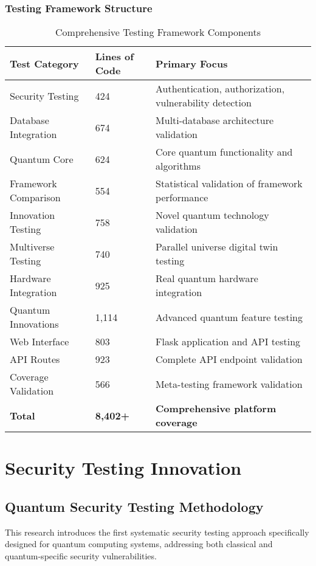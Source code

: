 \documentclass[12pt,a4paper]{report}
\begin{document}
\subsubsection{Testing Framework Structure}

\begin{table}[H]
\centering
\caption{Comprehensive Testing Framework Components}
\begin{tabular}{@{}p{4cm}p{2cm}p{6cm}@{}}
\toprule
Test Category & Lines of Code & Primary Focus \\
\midrule
Security Testing & 424 & Authentication, authorization, vulnerability detection \\
Database Integration & 674 & Multi-database architecture validation \\
Quantum Core & 624 & Core quantum functionality and algorithms \\
Framework Comparison & 554 & Statistical validation of framework performance \\
Innovation Testing & 758 & Novel quantum technology validation \\
Multiverse Testing & 740 & Parallel universe digital twin testing \\
Hardware Integration & 925 & Real quantum hardware integration \\
Quantum Innovations & 1,114 & Advanced quantum feature testing \\
Web Interface & 803 & Flask application and API testing \\
API Routes & 923 & Complete API endpoint validation \\
Coverage Validation & 566 & Meta-testing framework validation \\
\textbf{Total} & \textbf{8,402+} & \textbf{Comprehensive platform coverage} \\
\bottomrule
\end{tabular}
\end{table}

\section{Security Testing Innovation}

\subsection{Quantum Security Testing Methodology}

This research introduces the first systematic security testing approach specifically designed for quantum computing systems, addressing both classical and quantum-specific security vulnerabilities.
\end{document}
